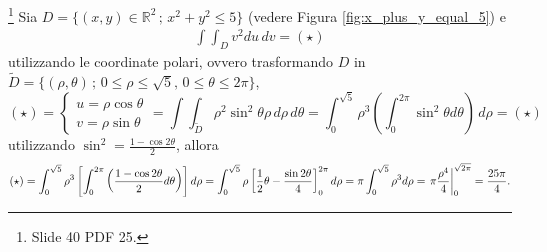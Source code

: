 \begin{example}\footnote{Slide 40 PDF 25.}
	Sia $D = \{(x,y)\in\mathbb{R}^2\,;\, x^2+y^2\leq 5\}$ (vedere Figura \ref{fig:x_plus_y_equal_5}) e
	\begin{equation*}
		\begin{matrix}
			\int\int_D v^2 du\, dv = (\star)
		\end{matrix}
	\end{equation*}
	utilizzando le coordinate polari, ovvero trasformando $D$ in $\tilde D=\{(\rho, \theta)\,;\, 0\leq \rho\leq \sqrt{5},\, 0\leq \theta\leq 2\pi\}$,
	\begin{equation*}
		(\star) =
		\begin{cases}
			u  = \rho \cos\theta\\
			v =  \rho \sin \theta
		\end{cases} = 
		\int\int_{\tilde{D}} \rho^2 \sin^2\theta\rho\,  d\rho\, d\theta = \int_0^{\sqrt{5}}\rho^3 \left(\int_0^{2\pi} \sin^2\theta d\theta\right)\, d\rho = (\star)
	\end{equation*}
	utilizzando $\sin ^2 = \frac{1-\cos2\theta}{2}$, allora
	\begin{equation*}
		(\star) = \int_0^{\sqrt{5}} \rho^3\left[\int_0^{2\pi} \left(\frac{1-\cos 2\theta}{2} d\theta\right)\right]d\rho = \int_0^{\sqrt{5}}\rho\left[\frac{1}{2}\theta -\frac{\sin 2\theta}{4}\right]_0^{2\pi}d\rho = \pi\int_0^{\sqrt{5}}\rho^3 d\rho = \left.\pi\frac{\rho^4}{4}\right\rvert_{0}^{\sqrt{2\pi}} = \frac{25\pi}{4}.
	\end{equation*}
	\begin{figure}[ht]
		\centering
\end{figure}
\end{example}
